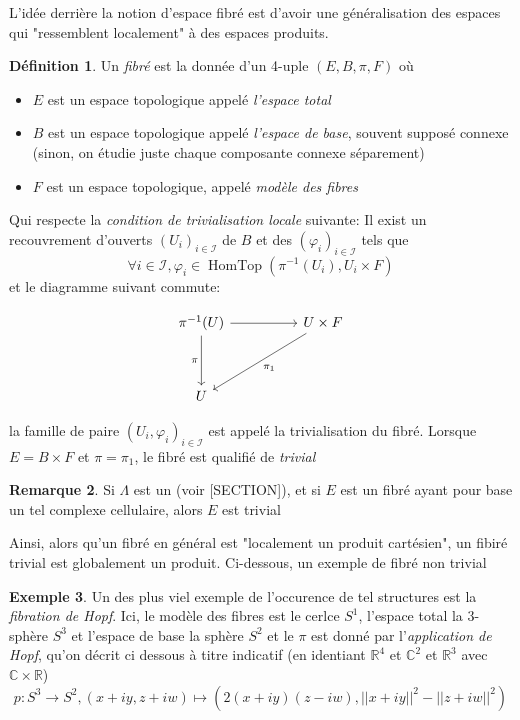 \documentclass[a4paper,12pt,oneside,titlepage]{article}
\newcommand{\R}[0]{\mathbb{R}}
\theoremstyle{definition}
\newtheorem{definition}{Définition}[section]
\newtheorem{remarque}[definition]{Remarque}
\newtheorem{exemple}[definition]{Exemple}
\theoremstyle{plain}
\begin{document}
L'idée derrière la notion d'espace fibré est d'avoir une généralisation des
espaces qui "ressemblent localement" à des espaces produits.

\begin{definition}
    Un \textit{fibré} est la donnée d'un 4-uple $(E,B,\pi,F)$ où
    \begin{itemize}
        \item $E$ est un espace topologique appelé \textit{l'espace total}
        \item $B$ est un espace topologique appelé \textit{l'espace de base}, souvent supposé connexe (sinon, on étudie juste chaque composante connexe séparement)
        \item $F$ est un espace topologique, appelé \textit{modèle des fibres}
    \end{itemize}
    Qui respecte la \textit{condition de trivialisation locale} suivante: Il exist un recouvrement d'ouverts $(U_i)_{i\in\mathcal{I}}$ de $B$ et des $(\varphi_i)_{i\in\mathcal{I}}$ tels que
    \begin{equation*}
        \forall i\in\mathcal{I}, \varphi_i\in\operatorname*{HomTop}(\pi^{-1}(U_i),U_i\times F)
    \end{equation*}
    et le diagramme suivant commute:\\
    \begin{center}
        \[\begin{tikzcd}
	{\pi^{-1}(U)} && {U\times F} \\
	\\
	U
	\arrow[from=1-1, to=1-3]
	\arrow["\pi"', from=1-1, to=3-1]
	\arrow["{\pi_1}", from=1-3, to=3-1]
    \end{tikzcd}\]
    \end{center}
la famille de paire $(U_i,\varphi_i)_{i\in\mathcal{I}}$ est appelé la trivialisation du fibré.
Lorsque $E=B\times F$ et $\pi=\pi_1$, le fibré est qualifié de \textit{trivial}
\end{definition}
\begin{remarque}
    Si $\Lambda$ est un  (voir [SECTION]), et si $E$ est un fibré ayant pour base un tel complexe cellulaire, alors $E$ est trivial
\end{remarque}
Ainsi, alors qu'un fibré en général est "localement un produit cartésien", un fibiré trivial est globalement un produit. Ci-dessous, un exemple de fibré non trivial
\begin{exemple}
    Un des plus viel exemple de l'occurence de tel structures est la \textit{fibration de Hopf}. Ici, le modèle des fibres est le cerlce $S^1$, l'espace total la $3$-sphère $S^3$ et l'espace de base la sphère $S^2$ et le $\pi$ est donné par l'\textit{application de Hopf}, qu'on décrit ci dessous à titre indicatif (en identiant $\R^4$ et $\mathbb{C}^2$  et $\R^3$ avec $\mathbb{C}\times \R$)
    \begin{equation*}
        p: S^3\rightarrow S^2, (x+iy,z+iw)\mapsto (2(x+iy)(z-iw),||x+iy||^2-||z+iw||^2)
    \end{equation*}
\end{exemple}
\end{document}
